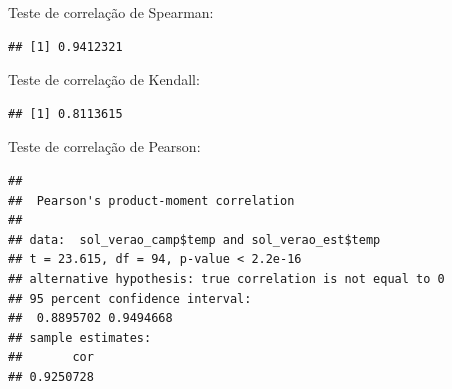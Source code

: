 \documentclass[
]{book}
\newenvironment{Shaded}{\begin{snugshade}}{\end{snugshade}}
\newcommand{\DataTypeTok}[1]{\textcolor[rgb]{0.13,0.29,0.53}{#1}}
\newcommand{\KeywordTok}[1]{\textcolor[rgb]{0.13,0.29,0.53}{\textbf{#1}}}
\newcommand{\NormalTok}[1]{#1}
\newcommand{\OperatorTok}[1]{\textcolor[rgb]{0.81,0.36,0.00}{\textbf{#1}}}
\newcommand{\StringTok}[1]{\textcolor[rgb]{0.31,0.60,0.02}{#1}}
\begin{document}
Teste de correlação de Spearman:

\begin{Shaded}
\end{Shaded}

\begin{verbatim}
## [1] 0.9412321
\end{verbatim}

Teste de correlação de Kendall:

\begin{Shaded}
\end{Shaded}

\begin{verbatim}
## [1] 0.8113615
\end{verbatim}

Teste de correlação de Pearson:

\begin{Shaded}
\end{Shaded}

\begin{verbatim}
## 
##  Pearson's product-moment correlation
## 
## data:  sol_verao_camp$temp and sol_verao_est$temp
## t = 23.615, df = 94, p-value < 2.2e-16
## alternative hypothesis: true correlation is not equal to 0
## 95 percent confidence interval:
##  0.8895702 0.9494668
## sample estimates:
##       cor 
## 0.9250728
\end{verbatim}

\begin{Shaded}
\end{Shaded}
\end{document}
